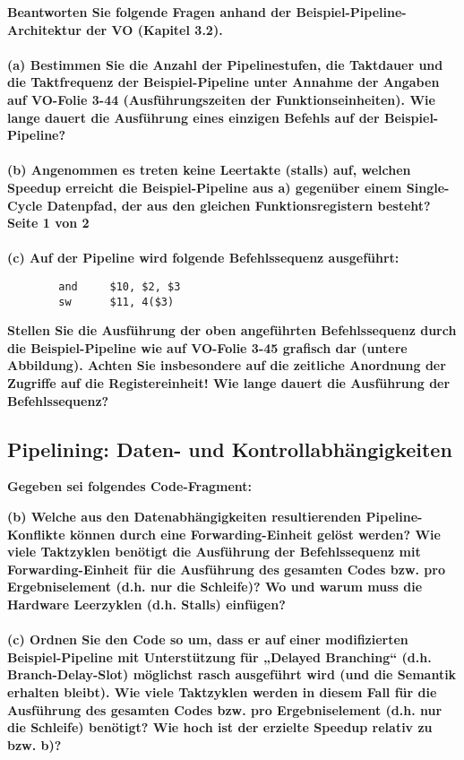 \documentclass[11pt]{article}
\begin{document}
    \textbf{Beantworten Sie folgende Fragen anhand der Beispiel-Pipeline-Architektur der VO (Kapitel 3.2).\\\\
    (a) Bestimmen Sie die Anzahl der Pipelinestufen, die Taktdauer und die Taktfrequenz der
    Beispiel-Pipeline unter Annahme der Angaben auf VO-Folie 3-44 (Ausführungszeiten der
    Funktionseinheiten). Wie lange dauert die Ausführung eines einzigen Befehls auf der
    Beispiel-Pipeline?\\\\
    (b) Angenommen es treten keine Leertakte (stalls) auf, welchen Speedup erreicht die
    Beispiel-Pipeline aus a) gegenüber einem Single-Cycle Datenpfad, der aus den gleichen
    Funktionsregistern besteht?\\
    Seite 1 von 2\\\\
    (c) Auf der Pipeline wird folgende Befehlssequenz ausgeführt:\\}
    \begin{verbatim}
        and     $10, $2, $3
        sw      $11, 4($3)
    \end{verbatim}

    \textbf{    Stellen Sie die Ausführung der oben angeführten Befehlssequenz durch die Beispiel-Pipeline
    wie auf VO-Folie 3-45 grafisch dar (untere Abbildung). Achten Sie insbesondere auf die
    zeitliche Anordnung der Zugriffe auf die Registereinheit! Wie lange dauert die Ausführung der
    Befehlssequenz?}


    \subsection{Pipelining: Daten- und Kontrollabhängigkeiten}
    \textbf{Gegeben sei folgendes Code-Fragment:}

    \begin{center}
        
    
    \end{center}


	
	
    \textbf{
    (b) Welche aus den Datenabhängigkeiten resultierenden Pipeline-Konflikte können durch
    eine Forwarding-Einheit gelöst werden? Wie viele Taktzyklen benötigt die Ausführung der
    Befehlssequenz mit Forwarding-Einheit für die Ausführung des gesamten Codes bzw. pro
    Ergebniselement (d.h. nur die Schleife)? Wo und warum muss die Hardware Leerzyklen
    (d.h. Stalls) einfügen?\\\\
    (c) Ordnen Sie den Code so um, dass er auf einer modifizierten Beispiel-Pipeline mit
    Unterstützung für „Delayed Branching“ (d.h. Branch-Delay-Slot) möglichst rasch
    ausgeführt wird (und die Semantik erhalten bleibt). Wie viele Taktzyklen werden in diesem
    Fall für die Ausführung des gesamten Codes bzw. pro Ergebniselement (d.h. nur die
    Schleife) benötigt? Wie hoch ist der erzielte Speedup relativ zu bzw. b)?}
\end{document}
